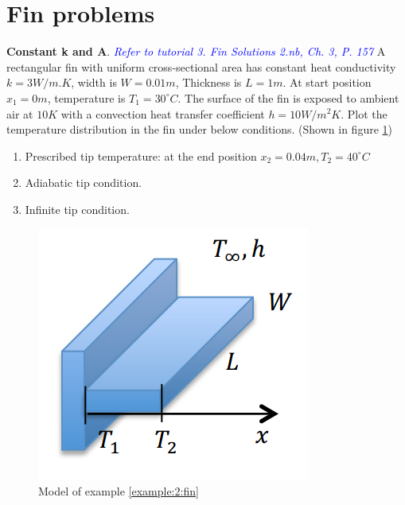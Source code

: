 \section{Fin problems}
\begin{example}
\label{example:2:fin}
\textbf{Constant k and A}. 
\textcolor{blue} {\emph{Refer to tutorial 3.  Fin Solutions 2.nb, Ch. 3, P. 157}}
A rectangular fin with uniform cross-sectional area has constant heat conductivity
$k=3W/m.K$, width is $W=0.01m$, Thickness is $L=1m$. At start position $x_1=0m$, temperature is $T_1=30^\circ C$. The surface of the fin is exposed to ambient air at $10K$ with a convection heat transfer coefficient $h=10W/m^2K$.
Plot the temperature distribution in the fin under below conditions. (Shown in figure \ref{fig:2:12})
\begin{enumerate}
\item Prescribed tip temperature: at the end position $x_2=0.04m, T_2=40^\circ C$
\item Adiabatic tip condition.
\item Infinite tip condition.
\end{enumerate}
\begin{figure}[h!]
  \centering
    \includegraphics[scale=0.7]{figures/ch2/12}
    \caption{Model of example \ref{example:2:fin}}
    \label{fig:2:12}
\end{figure}
\end{example}

